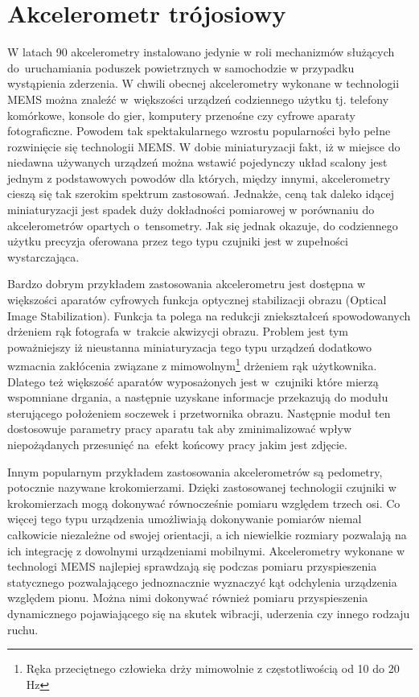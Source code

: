 \section{Akcelerometr trójosiowy}
\label{sec:accelometer}
W latach 90 akcelerometry instalowano jedynie w roli mechanizmów służących do~uruchamiania poduszek powietrznych w samochodzie w przypadku wystąpienia
zderzenia. W chwili obecnej akcelerometry wykonane w technologii
MEMS można znaleźć w~większości urządzeń codziennego użytku tj.
telefony komórkowe, konsole do gier, komputery przenośne czy cyfrowe aparaty
fotograficzne. Powodem tak spektakularnego wzrostu popularności było pełne
rozwinięcie się technologii MEMS. W dobie miniaturyzacji fakt, iż w miejsce do
niedawna używanych urządzeń można wstawić pojedynczy układ
scalony jest jednym z podstawowych powodów dla których, między innymi,
akcelerometry cieszą się tak szerokim spektrum zastosowań. Jednakże, ceną tak
daleko idącej miniaturyzacji jest spadek duży dokładności pomiarowej w
porównaniu do akcelerometrów opartych o~tensometry. Jak się jednak okazuje, do
codziennego użytku precyzja oferowana przez tego typu czujniki jest w zupełności wystarczająca.

Bardzo dobrym przykładem zastosowania akcelerometru jest dostępna w większości
aparatów cyfrowych funkcja optycznej stabilizacji obrazu (Optical Image
Stabilization). Funkcja ta polega na redukcji zniekształceń  spowodowanych
drżeniem rąk fotografa w~trakcie akwizycji obrazu. Problem jest tym poważniejszy
iż nieustanna miniaturyzacja tego typu urządzeń dodatkowo wzmacnia zakłócenia
związane z mimowolnym\footnote{Ręka przeciętnego człowieka drży mimowolnie z
częstotliwością od 10 do 20 Hz} drżeniem rąk użytkownika. Dlatego też większość
aparatów wyposażonych jest w~czujniki które mierzą wspomniane drgania, a następnie uzyskane informacje przekazują do modułu
sterującego położeniem soczewek i przetwornika obrazu. Następnie moduł ten
dostosowuje parametry pracy aparatu tak aby zminimalizować wpływ niepożądanych
przesunięć na~efekt końcowy pracy jakim jest zdjęcie.

Innym popularnym przykładem zastosowania akcelerometrów są pedometry, potocznie 
nazywane krokomierzami. Dzięki zastosowanej technologii czujniki w krokomierzach
mogą dokonywać równocześnie pomiaru względem trzech osi. Co więcej tego typu
urządzenia umożliwiają dokonywanie pomiarów niemal całkowicie niezależne od
swojej orientacji, a ich niewielkie rozmiary pozwalają na ich integrację z 
dowolnymi urządzeniami mobilnymi. Akcelerometry wykonane w technologi MEMS
najlepiej sprawdzają się  podczas pomiaru przyspieszenia statycznego
pozwalającego jednoznacznie wyznaczyć kąt odchylenia urządzenia względem pionu. 
Można nimi dokonywać również pomiaru przyspieszenia dynamicznego pojawiającego 
się na skutek wibracji, uderzenia czy innego rodzaju ruchu. 

